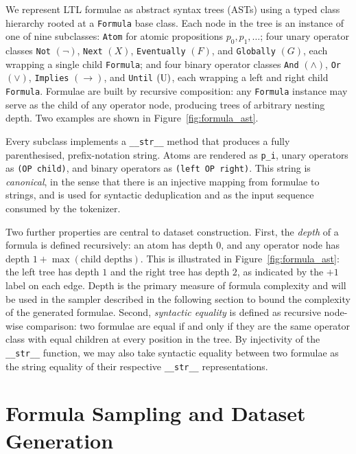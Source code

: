 \documentclass[titlepage,a4paper,11pt]{report}
\begin{document}
    We represent LTL formulae as abstract syntax trees (ASTs) using a typed class hierarchy rooted at a \texttt{Formula} base class. Each node in the tree is an instance of one of nine subclasses: \texttt{Atom} for atomic propositions $p_0, p_1, \ldots$; four unary operator classes \texttt{Not} $(\neg)$, \texttt{Next} $(X)$, \texttt{Eventually} $(F)$, and \texttt{Globally} $(G)$, each wrapping a single child \texttt{Formula}; and four binary operator classes \texttt{And} $(\land)$, \texttt{Or} $(\lor)$, \texttt{Implies} $(\to)$, and \texttt{Until} $(\text{U})$, each wrapping a left and right child \texttt{Formula}. Formulae are built by recursive composition: any \texttt{Formula} instance may serve as the child of any operator node, producing trees of arbitrary nesting depth. Two examples are shown in Figure~\ref{fig:formula_ast}.

    Every subclass implements a \texttt{\_\_str\_\_} method that produces a fully parenthesised, prefix-notation string. Atoms are rendered as \texttt{p\_i}, unary operators as \texttt{(OP child)}, and binary operators as \texttt{(left OP right)}. This string is  \emph{canonical}, in the sense that there is an injective mapping from formulae to strings, and is used for syntactic deduplication and as the input sequence consumed by the tokenizer.

    Two further properties are central to dataset construction. First, the \emph{depth} of a formula is defined recursively: an atom has depth $0$, and any operator node has depth $1 + \max(\text{child depths})$. This is illustrated in Figure~\ref{fig:formula_ast}: the left tree has depth $1$ and the right tree has depth $2$, as indicated by the $+1$ label on each edge. Depth is the primary measure of formula complexity and will be used in the sampler described in the following section to bound the complexity of the generated formulae. Second, \emph{syntactic equality} is defined as recursive node-wise comparison: two formulae are equal if and only if they are the same operator class with equal children at every position in the tree. By injectivity of the \texttt{\_\_str\_\_} function, we may also take syntactic equality between two formulae as the string equality of their respective \texttt{\_\_str\_\_} representations.
    
    \section{Formula Sampling and Dataset Generation}
\end{document}

